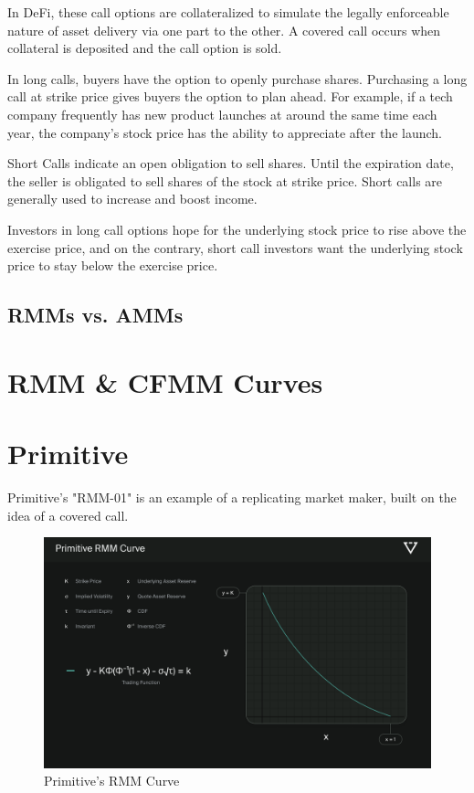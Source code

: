 \documentclass[12pt]{article}
\begin{document}
In DeFi, these call options are collateralized to simulate the legally enforceable nature of asset delivery via one part to the other. A covered call occurs when collateral is deposited and the call option is sold. 

In long calls, buyers have the option to openly purchase shares. Purchasing a long call at strike price gives buyers the option to plan ahead. For example, if a tech company frequently has new product launches at around the same time each year, the company’s stock price has the ability to appreciate after the launch. 

Short Calls indicate an open obligation to sell shares. Until the expiration date, the seller is obligated to sell shares of the stock at strike price. Short calls are generally used to increase and boost income. 

Investors in long call options hope for the underlying stock price to rise above the exercise price, and on the contrary, short call investors want the underlying stock price to stay below the exercise price. 

\subsection{RMMs vs. AMMs}

\section{RMM \& CFMM Curves}

\section{Primitive}
Primitive's "RMM-01" is an example of a replicating market maker, built on the idea of a covered call.

\begin{figure}[H]
    \centering
    \includegraphics[width=0.8\linewidth]{Primitive.png}
    \caption{Primitive's RMM Curve}
    \label{fig:primitive}
\end{figure}
\end{document}
